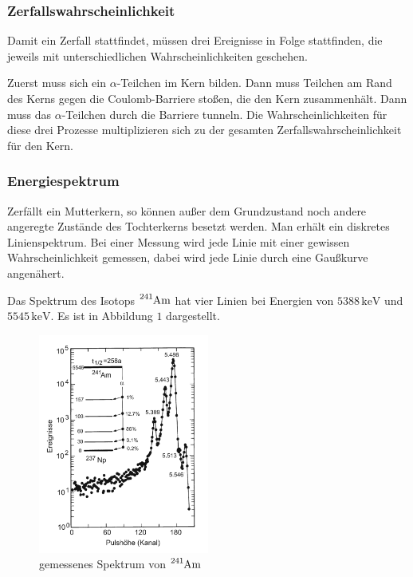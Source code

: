 \documentclass[12pt,a4paper]{scrartcl}
\numberwithin{equation}{section} %
\begin{document}
\hypertarget{zerfallswahrscheinlichkeit}{%
\subsubsection{Zerfallswahrscheinlichkeit}\label{zerfallswahrscheinlichkeit}}

Damit ein Zerfall stattfindet, müssen drei Ereignisse in Folge stattfinden, die jeweils mit unterschiedlichen Wahrscheinlichkeiten geschehen.

Zuerst muss sich ein $\alpha$-Teilchen im Kern bilden. Dann muss Teilchen am Rand des Kerns gegen die Coulomb-Barriere stoßen, die den Kern zusammenhält. Dann muss das $\alpha$-Teilchen durch die Barriere tunneln. Die Wahrscheinlichkeiten für diese drei Prozesse multiplizieren sich zu der gesamten Zerfallswahrscheinlichkeit für den Kern.

\hypertarget{energiespektrum}{%
\subsubsection{Energiespektrum}\label{energiespektrum}}

Zerfällt ein Mutterkern, so können außer dem Grundzustand noch andere angeregte Zustände des Tochterkerns besetzt werden. Man erhält ein diskretes Linienspektrum. Bei einer Messung wird jede Linie mit einer gewissen Wahrscheinlichkeit gemessen, dabei wird jede Linie durch eine
Gaußkurve angenähert.

Das Spektrum des Isotops $\ce{^241Am}$ hat vier Linien bei Energien von $5388\mathrm{\,keV}$ und $5545\mathrm{\,keV}$. \cite{Bethge} Es ist in Abbildung $1$ dargestellt.

\begin{figure}[h!]
	\centering
	\includegraphics[width=0.5\textwidth]{../media/B3.3/Am241_Spektrum.pdf}
	\caption{gemessenes Spektrum von $\ce{^241Am}$ \cite{Bethge}}
	\label{abb:Spektrum 241Am}
\end{figure}
\end{document}
